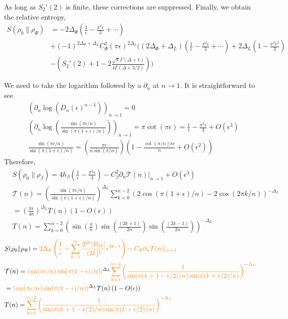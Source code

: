 \documentclass[11pt]{article}
\newcommand{\ep}{\epsilon}
\newcommand{\p}{\partial}
\newcommand{\nn}{\nonumber}
\newcommand{\lb}{\left(}
\newcommand{\rb}{\right)}
\newcommand{\JM}[1]{\textcolor{orange}{#1}}
\begin{document}
As long as $S_2'(2)$ is finite, these corrections are suppressed.
Finally, we obtain the relative entropy,
\begin{align}
    S(\rho_0\|\rho_\Phi) &= - 2\Delta_\Phi \lb \frac{1}{\ep} - \frac{\pi^2\ep}{3} +\cdots \rb \nn \\&+ (-1)^{2\Delta_\Phi + \Delta_L}C_\Phi^2 (\pi \ep)^{2\Delta_L } \Bigg( (2\Delta_\Phi + \Delta_L  ) \lb \frac{1}{\ep} - \frac{\pi^2 \ep}{3}+\cdots\rb+2\Delta_L \lb 1-\frac{\pi^2 \ep^2}{3}\rb \nn \\
    &- \lb  S_2'(2) +1 - 2\frac{\sqrt \pi \Gamma (\Delta +1)}{4\Gamma (\Delta + 3/2)} \rb\Bigg)
\end{align}

We need to take the logarithm followed by a $\partial_n$ at $n\to 1$. It is straightforward to see
\begin{align}
&  \lb \p_n\log \lb D_n(\ep)^{n-1}\rb\rb_{n\to 1}=0\nn\\
&\lb \p_n\log \lb \frac{\sin(\pi\epsilon/n)}{\sin(\pi(1+\epsilon)/n)}\rb\rb_{n\to 1}=\pi\cot(\pi\ep)=\frac{1}{\ep}-\frac{\pi^2 \ep}{3}+O(\ep^3)\nn\\
&\frac{\sin(\pi\epsilon/n)}{\sin(\pi(1+\epsilon)/n)}=\lb\frac{\pi \ep}{n\sin(\pi/n)} \rb
\lb 1-\frac{\cot(\pi/n)\pi \ep}{n}+O(\ep^2)\rb
\end{align}
Therefore,
\begin{align}
  &S(\rho_0\|\rho_\beta)=4h_\beta\lb\frac{1}{\ep}-\frac{\pi^2\ep}{3}\rb- C_\beta^2 \p_n\mathcal{T}(n)|_{n\to 1}+O(\ep^3)\nn\\
  &\mathcal{T}(n)=\lb\frac{\sin(\pi\epsilon/n)}{\sin(\pi(1+\epsilon)/n)}\rb^{\Delta_L}\sum_{k=0}^{n-2} \lb 2\cos(\pi(1+\ep)/n)-2\cos(2\pi k/n) \rb^{-\Delta_L}\nn\\
  &=\lb\frac{\pi \ep}{4n}\rb^{\Delta_L}T(n)\lb 1-O(\ep)\rb\nn\\
  &T(n)=\sum_{k=0}^{n-2}\lb \sin\lb\frac{\pi}{n}\rb\sin\lb\frac{(2k+1)}{2n}\rb\sin\lb \frac{(2k-1)}{2n}\rb\rb^{-\Delta_L}
\end{align}
\begin{align*}
  &S(\rho_0\|\rho_\Phi)=\JM{2\Delta_\Phi \lb\frac{1}{\ep}- \sum_{k=1}^{\infty} \frac{2^{2k}|B_{2k}|} {(2k)!}\ep^{2k-1} 
  \rb - C_\Phi \p_n\mathcal{T}(n)|_{n\to 1}}\nn\\
  &\mathcal{T}(n)=\JM{\lb\sin(\pi\epsilon/n)\sin(\pi(1-\epsilon)/n)\rb}^{\Delta_L}\JM{\sum_{k=1}^{n-2} \lb \frac{1}{\sin(\pi (k+1-\ep/2)/n) \sin (\pi (k+\ep/2) /n)}\rb^{-\Delta_L}}\nn\\
  &=\JM{\lb\sin(\pi\epsilon/n)\sin(\pi(1-\epsilon)/n)\rb}^{\Delta_L}T(n)\lb 1-O(\ep)\rb\nn\\
  &T(n)=\JM{\sum_{k=1}^{n-2}\lb \frac{1}{\sin(\pi (k+1-\ep/2)/n) \sin (\pi (k+\ep/2) /n)}\rb^{-\Delta_L}}
\end{align*}
\end{document}
